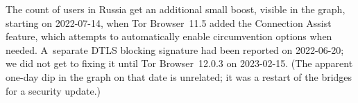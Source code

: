 \documentclass[letterpaper,twocolumn]{article}
\begin{document}
The count of users in Russia get an additional small boost,
visible in the graph,
starting on \mbox{2022-07-14},
when Tor Browser~11.5 added the Connection Assist feature,
which attempts to automatically enable circumvention options when needed.
A~separate DTLS blocking signature had been reported on \mbox{2022-06-20};
we did not get to fixing it until Tor Browser~12.0.3 on \mbox{2023-02-15}.
(The apparent one-day dip in the graph on that date is unrelated;
it was a restart of the bridges for a security update.)
\end{document}
